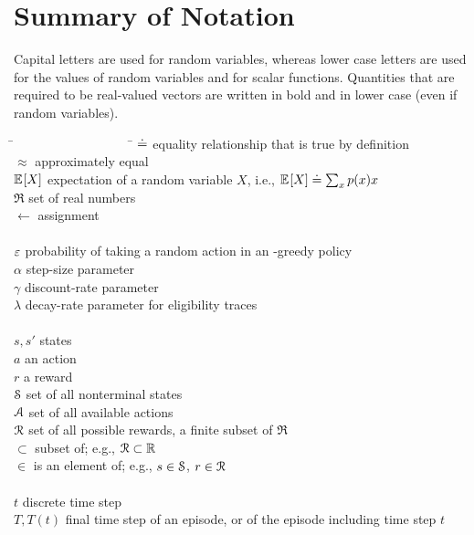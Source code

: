 \documentclass[a4paper, twoside, 12pt]{article}
\begin{document}
\section*{Summary of Notation} 
Capital letters are used for random variables, whereas lower case letters are used for
the values of random variables and for scalar functions. Quantities that are required to
be real-valued vectors are written in bold and in lower case (even if random variables).
\begin{tabbing}
    \=~~~~~~~~~~~~~~~~~~  \= \kill
    \>$\defeq$            \> equality relationship that is true by definition\\
    \>$\approx$           \> approximately equal\\
    \>$\E{X}$             \> expectation of a random variable $X$, i.e., $\E{X}\defeq\sum_x p(x)x$\\
    \>$\Re$               \> set of real numbers\\
    \>$\leftarrow$        \> assignment\\
    \\
    \>$\e$                \> probability of taking a random action in an \e-greedy policy\\
    \>$\alpha$            \> step-size parameter\\
    \>$\gamma$            \> discount-rate parameter\\
    \>$\lambda$           \> decay-rate parameter for eligibility traces\\
    \\
    \>$s, s'$             \> states\\
    \>$a$                 \> an action\\
    \>$r$                 \> a reward\\
    \>$\S$                \> set of all nonterminal states\\
    \>$\A$                \> set of all available actions\\
    \>$\R$                \> set of all possible rewards, a finite subset of $\Re$\\
    \>$\subset$           \> subset of; e.g., $\R\subset\Re$\\
    \>$\in$               \> is an element of; e.g., $s\in\S$, $r\in\R$\\
    \\
    \>$t$                 \> discrete time step\\
    \>$T, T(t)$           \> final time step of an episode, or of the episode including time step $t$\\

\end{tabbing}
\end{document}
